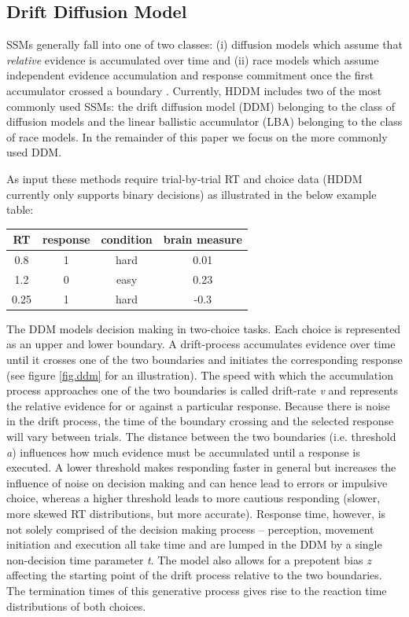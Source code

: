 \documentclass[letterpaper,10pt,english]{article}
\begin{document}
\subsection*{Drift Diffusion Model}
\label{methods:sequential-sampling-models}
SSMs generally fall into one of two classes: (i) diffusion models
which assume that \emph{relative} evidence is accumulated over time
and (ii) race models which assume independent evidence accumulation
and response commitment once the first accumulator crossed a boundary
\citep{LaBerge62,Vickers70}. Currently, HDDM includes two of the most
commonly used SSMs: the drift diffusion model (DDM)
\citep{RatcliffRouder98,RatcliffMcKoon08} belonging to the
class of diffusion models and the linear ballistic accumulator (LBA)
\citep{BrownHeathcote08} belonging to the class of race models. In the
remainder of this paper we focus on the more commonly used DDM.

As input these methods require trial-by-trial RT and choice data (HDDM
currently only supports binary decisions) as illustrated in the below
example table:

\begin{tabular}{c|c|c|c}
RT & response & condition & brain measure \\
\hline
0.8 & 1 & hard & 0.01 \\
1.2 & 0 & easy & 0.23 \\
0.25 & 1 & hard & -0.3
\end{tabular}

The DDM models decision making in two-choice tasks. Each choice is
represented as an upper and lower boundary. A drift-process
accumulates evidence over time until it crosses one of the two
boundaries and initiates the corresponding response
\citep{RatcliffRouder98,SmithRatcliff04} (see figure \ref{fig.ddm} for
an illustration). The speed with which the accumulation process
approaches one of the two boundaries is called drift-rate \emph{v} and
represents the relative evidence for or against a particular response.
Because there is noise in the drift process, the time of the boundary
crossing and the selected response will vary between trials. The
distance between the two boundaries (i.e. threshold \emph{a})
influences how much evidence must be accumulated until a response is
executed. A lower threshold makes responding faster in general but
increases the influence of noise on decision making and can hence lead
to errors or impulsive choice, whereas a higher threshold leads to
more cautious responding (slower, more skewed RT distributions, but
more accurate). Response time, however, is not solely comprised of the
decision making process -- perception, movement initiation and
execution all take time and are lumped in the DDM by a single
non-decision time parameter \emph{t}. The model also allows for a
prepotent bias \emph{z} affecting the starting point of the drift
process relative to the two boundaries. The termination times of this
generative process gives rise to the reaction time distributions of
both choices.
\end{document}
